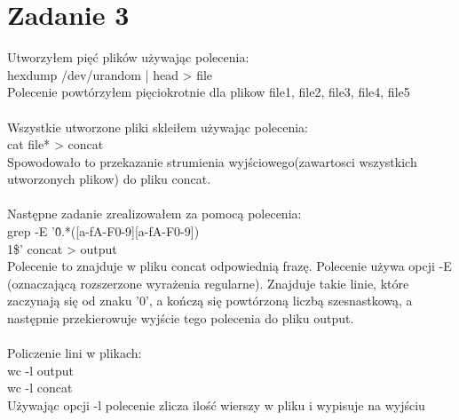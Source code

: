 \documentclass[a4paper, 11pt]{article}
\begin{document}
\section{Zadanie 3}

Utworzyłem pięć plików używając polecenia:\\
hexdump /dev/urandom | head > file\\
Polecenie powtórzyłem pięciokrotnie dla plikow file1, file2, file3, file4, file5\\
\\
Wszystkie utworzone pliki skleiłem używając polecenia:\\
cat file* > concat\\
Spowodowało to przekazanie strumienia wyjściowego(zawartosci wszystkich utworzonych plikow)
do pliku concat.\\
\\
Następne zadanie zrealizowałem za pomocą polecenia:\\
grep -E '\^0.*([a-fA-F0-9][a-fA-F0-9])\\1\$' concat > output\\
Polecenie to znajduje w pliku concat odpowiednią frazę. Polecenie używa opcji -E (oznaczającą
rozszerzone wyrażenia regularne). Znajduje takie linie, które zaczynają się od znaku '0',
a kończą się powtórzoną liczbą szesnastkową, a następnie przekierowuje wyjście tego polecenia
do pliku output.\\
\\
Policzenie lini w plikach:\\
wc -l output\\
wc -l concat\\
Używając opcji -l polecenie zlicza ilość wierszy w pliku i wypisuje na wyjściu
\end{document}
